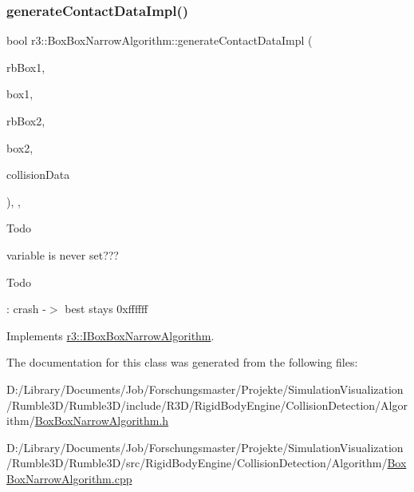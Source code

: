 \subsubsection{\texorpdfstring{generate\+Contact\+Data\+Impl()}{generateContactDataImpl()}}
{\footnotesize\ttfamily bool r3\+::\+Box\+Box\+Narrow\+Algorithm\+::generate\+Contact\+Data\+Impl (\begin{DoxyParamCaption}\item[{\mbox{\hyperlink{classr3_1_1_rigid_body}{Rigid\+Body}} $\ast$}]{rb\+Box1,  }\item[{\mbox{\hyperlink{classr3_1_1_collision_box}{Collision\+Box}} $\ast$}]{box1,  }\item[{\mbox{\hyperlink{classr3_1_1_rigid_body}{Rigid\+Body}} $\ast$}]{rb\+Box2,  }\item[{\mbox{\hyperlink{classr3_1_1_collision_box}{Collision\+Box}} $\ast$}]{box2,  }\item[{\mbox{\hyperlink{classr3_1_1_collision_data}{Collision\+Data}} \&}]{collision\+Data }\end{DoxyParamCaption})\hspace{0.3cm}{\ttfamily [override]}, {\ttfamily [protected]}, {\ttfamily [virtual]}}

\begin{DoxyRefDesc}{Todo}
\item[\mbox{\hyperlink{todo__todo000005}{Todo}}]variable is never set??? \end{DoxyRefDesc}


\begin{DoxyRefDesc}{Todo}
\item[\mbox{\hyperlink{todo__todo000006}{Todo}}]\+: crash -\/$>$ best stays 0xffffff \end{DoxyRefDesc}


Implements \mbox{\hyperlink{classr3_1_1_i_box_box_narrow_algorithm_abc15898100b5ed0537e4c6ccc6610069}{r3\+::\+I\+Box\+Box\+Narrow\+Algorithm}}.



The documentation for this class was generated from the following files\+:\begin{DoxyCompactItemize}
\item 
D\+:/\+Library/\+Documents/\+Job/\+Forschungsmaster/\+Projekte/\+Simulation\+Visualization/\+Rumble3\+D/\+Rumble3\+D/include/\+R3\+D/\+Rigid\+Body\+Engine/\+Collision\+Detection/\+Algorithm/\mbox{\hyperlink{_box_box_narrow_algorithm_8h}{Box\+Box\+Narrow\+Algorithm.\+h}}\item 
D\+:/\+Library/\+Documents/\+Job/\+Forschungsmaster/\+Projekte/\+Simulation\+Visualization/\+Rumble3\+D/\+Rumble3\+D/src/\+Rigid\+Body\+Engine/\+Collision\+Detection/\+Algorithm/\mbox{\hyperlink{_box_box_narrow_algorithm_8cpp}{Box\+Box\+Narrow\+Algorithm.\+cpp}}\end{DoxyCompactItemize}

